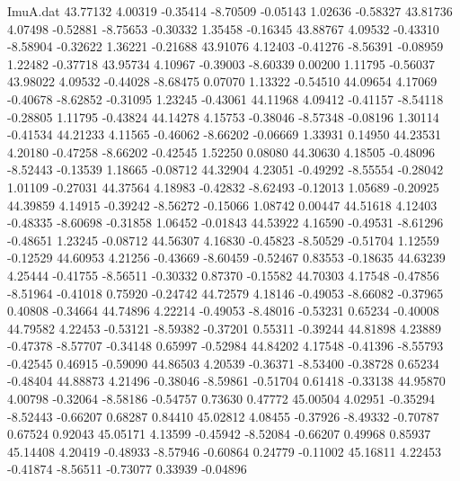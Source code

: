 \begin{filecontents}{ImuA.dat}
  43.77132    4.00319   -0.35414   -8.70509   -0.05143    1.02636   -0.58327
  43.81736    4.07498   -0.52881   -8.75653   -0.30332    1.35458   -0.16345
  43.88767    4.09532   -0.43310   -8.58904   -0.32622    1.36221   -0.21688
  43.91076    4.12403   -0.41276   -8.56391   -0.08959    1.22482   -0.37718
  43.95734    4.10967   -0.39003   -8.60339    0.00200    1.11795   -0.56037
  43.98022    4.09532   -0.44028   -8.68475    0.07070    1.13322   -0.54510
  44.09654    4.17069   -0.40678   -8.62852   -0.31095    1.23245   -0.43061
  44.11968    4.09412   -0.41157   -8.54118   -0.28805    1.11795   -0.43824
  44.14278    4.15753   -0.38046   -8.57348   -0.08196    1.30114   -0.41534
  44.21233    4.11565   -0.46062   -8.66202   -0.06669    1.33931    0.14950
  44.23531    4.20180   -0.47258   -8.66202   -0.42545    1.52250    0.08080
  44.30630    4.18505   -0.48096   -8.52443   -0.13539    1.18665   -0.08712
  44.32904    4.23051   -0.49292   -8.55554   -0.28042    1.01109   -0.27031
  44.37564    4.18983   -0.42832   -8.62493   -0.12013    1.05689   -0.20925
  44.39859    4.14915   -0.39242   -8.56272   -0.15066    1.08742    0.00447
  44.51618    4.12403   -0.48335   -8.60698   -0.31858    1.06452   -0.01843
  44.53922    4.16590   -0.49531   -8.61296   -0.48651    1.23245   -0.08712
  44.56307    4.16830   -0.45823   -8.50529   -0.51704    1.12559   -0.12529
  44.60953    4.21256   -0.43669   -8.60459   -0.52467    0.83553   -0.18635
  44.63239    4.25444   -0.41755   -8.56511   -0.30332    0.87370   -0.15582
  44.70303    4.17548   -0.47856   -8.51964   -0.41018    0.75920   -0.24742
  44.72579    4.18146   -0.49053   -8.66082   -0.37965    0.40808   -0.34664
  44.74896    4.22214   -0.49053   -8.48016   -0.53231    0.65234   -0.40008
  44.79582    4.22453   -0.53121   -8.59382   -0.37201    0.55311   -0.39244
  44.81898    4.23889   -0.47378   -8.57707   -0.34148    0.65997   -0.52984
  44.84202    4.17548   -0.41396   -8.55793   -0.42545    0.46915   -0.59090
  44.86503    4.20539   -0.36371   -8.53400   -0.38728    0.65234   -0.48404
  44.88873    4.21496   -0.38046   -8.59861   -0.51704    0.61418   -0.33138
  44.95870    4.00798   -0.32064   -8.58186   -0.54757    0.73630    0.47772
  45.00504    4.02951   -0.35294   -8.52443   -0.66207    0.68287    0.84410
  45.02812    4.08455   -0.37926   -8.49332   -0.70787    0.67524    0.92043
  45.05171    4.13599   -0.45942   -8.52084   -0.66207    0.49968    0.85937
  45.14408    4.20419   -0.48933   -8.57946   -0.60864    0.24779   -0.11002
  45.16811    4.22453   -0.41874   -8.56511   -0.73077    0.33939   -0.04896

\end{filecontents}
